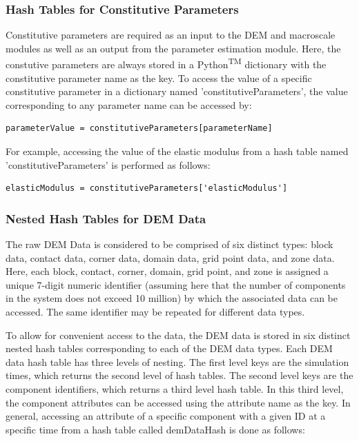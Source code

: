 \subsubsection*{Hash Tables for Constitutive Parameters}

Constitutive parameters are required as an input to the DEM and macroscale modules as well as an output from the parameter estimation module. Here, the constutive parameters are always stored in a Python\textsuperscript{TM} dictionary with the constitutive parameter name as the key. To access the value of a specific constitutive parameter in a dictionary named 'constitutiveParameters', the value corresponding to any parameter name can be accessed by:

\begin{lstlisting}[frame=single]
parameterValue = constitutiveParameters[parameterName]
\end{lstlisting}

For example, accessing the value of the elastic modulus from a hash table named 'constitutiveParameters' is performed as follows:

\begin{lstlisting}[frame=single]
elasticModulus = constitutiveParameters['elasticModulus']
\end{lstlisting}

\subsubsection*{Nested Hash Tables for DEM Data}
The raw DEM Data is considered to be comprised of six distinct types: block data, contact data, corner data, domain data, grid point data, and zone data. Here, each block, contact, corner, domain, grid point, and zone is assigned a unique 7-digit numeric identifier (assuming here that the number of components in the system does not exceed 10 million) by which the associated data can be accessed. The same identifier may be repeated for different data types.

To allow for convenient access to the data, the DEM data is stored in six distinct nested hash tables corresponding to each of the DEM data types.  Each DEM data hash table has three levels of nesting. The first level keys are the simulation times, which returns the second level of hash tables. The second level keys are the component identifiers, which returns a third level hash table. In this third level, the component attributes can be accessed using the attribute name as the key. In general, accessing an attribute of a specific component with a given ID at a specific time from a hash table called demDataHash is done as follows:


